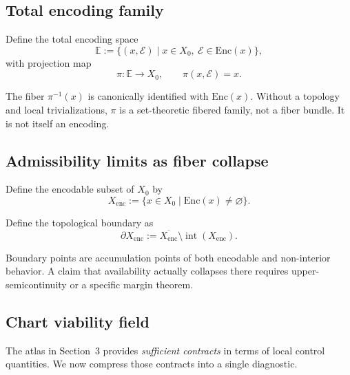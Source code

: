 \documentclass[11pt]{article}
\theoremstyle{plain}
\theoremstyle{plain}
\begin{document}
\subsection{Total encoding family}

\begin{definition}
Define the total encoding space
\[
\mathbb{E} := \{(x,\mathcal{E}) \mid x\in X_0,\ \mathcal{E}\in \mathrm{Enc}(x)\},
\]
with projection map
\[
\pi:\mathbb{E}\to X_0,\qquad \pi(x,\mathcal{E})=x.
\]
\end{definition}

\begin{remark}
The fiber $\pi^{-1}(x)$ is canonically identified with $\mathrm{Enc}(x)$.
Without a topology and local trivializations, $\pi$ is a set-theoretic
fibered family, not a fiber bundle.  It is not itself an encoding.
\end{remark}

\subsection{Admissibility limits as fiber collapse}

\begin{definition}
Define the encodable subset of $X_0$ by
\[
X_{\mathrm{enc}} := \{x\in X_0 \mid \mathrm{Enc}(x)\neq\varnothing\}.
\]
\end{definition}

\begin{definition}
Define the topological boundary as
\[
\partial X_{\mathrm{enc}} :=
\overline{X_{\mathrm{enc}}}
\setminus\operatorname{int}(X_{\mathrm{enc}}).
\]
\end{definition}

\begin{remark}
Boundary points are accumulation points of both encodable and non-interior
behavior.  A claim that availability actually collapses there requires
upper-semicontinuity or a specific margin theorem.
\end{remark}

\subsection{Chart viability field}

The atlas in Section~3 provides \emph{sufficient contracts} in terms of local control
quantities. We now compress those contracts into a single diagnostic.
\end{document}
